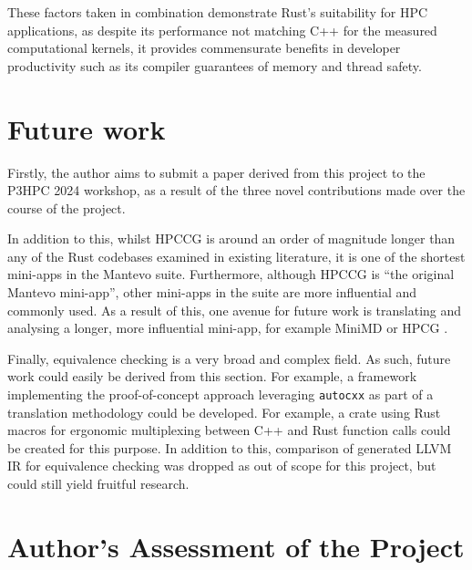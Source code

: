 These factors taken in combination demonstrate Rust's suitability for \acrshort{HPC} applications, as despite its performance not matching C++ for the measured computational kernels, it provides commensurate benefits in developer productivity such as its compiler guarantees of memory and thread safety.


\section{Future work}
\label{sec:future-work}

Firstly, the author aims to submit a paper derived from this project to the \acrfull{P3HPC} 2024 workshop, as a result of the three novel contributions made over the course of the project.

In addition to this, whilst \acrshort{HPCCG} is around an order of magnitude longer than any of the Rust codebases examined in existing literature, it is one of the shortest \acrshort{mini-app}s in the Mantevo suite. Furthermore, although \acrshort{HPCCG} is ``the original Mantevo mini-app'', other \acrshort{mini-app}s in the suite are more influential and commonly used. As a result of this, one avenue for future work is translating and analysing a longer, more influential \acrshort{mini-app}, for example MiniMD \cite{osti_1231191} or HPCG \cite{dongarra2015hpcg}.

Finally, equivalence checking is a very broad and complex field. As such, future work could easily be derived from this section. For example, a framework implementing the proof-of-concept approach leveraging \texttt{autocxx} as part of a translation methodology could be developed. For example, a crate using Rust macros for ergonomic multiplexing between C++ and Rust function calls could be created for this purpose. In addition to this, comparison of generated \acrshort{LLVM IR} for equivalence checking was dropped as out of scope for this project, but could still yield fruitful research.



\section{Author's Assessment of the Project}
\label{sec:reflection}

